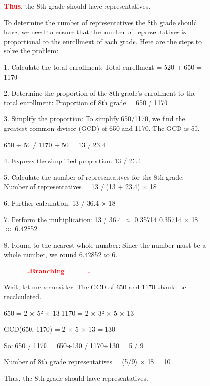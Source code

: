 \documentclass{article}
\begin{document}
\begin{figure}[h]
\begin{minipage}[t]{0.48\linewidth}
\begin{tcolorbox}
\textcolor{red}{\textbf{Thus}}, the 8th grade should have  representatives.
\end{tcolorbox}
\end{minipage} 
\hspace*{\fill}
\begin{minipage}[t]{0.48\linewidth} 
    \begin{tcolorbox}[
        colback=gray!5!white, 
        colframe=blue!75!brown, 
        title=APPO Branching, 
        boxrule=0.3mm, 
        width=\linewidth,  
        arc=2mm, 
        height=18cm,
        auto outer arc=true,
        top=2mm, bottom=2mm, left=2mm, right=2mm 
    ]
To determine the number of representatives the 8th grade should have, we need 
to ensure that the number of representatives is proportional to the enrollment 
of each grade. Here are the steps to solve the problem:

1. Calculate the total enrollment:
   Total enrollment = 520 + 650 = 1170

2. Determine the proportion of the 8th grade's enrollment to the total enrollment:
   Proportion of 8th grade = 650 / 1170

3. Simplify the proportion:
   To simplify 650/1170, we find the greatest common divisor (GCD) of 650 and 
   1170. The GCD is 50.
   
   650 ÷ 50 / 1170 ÷ 50 = 13 / 23.4   

4. Express the simplified proportion:
   13 / 23.4

5. Calculate the number of representatives for the 8th grade:
   Number of representatives = 13 / (13 + 23.4) × 18

6. Further calculation:
   13 / 36.4 × 18

7. Perform the multiplication:
   13 / 36.4 $\approx$ 0.35714
   0.35714 × 18 $\approx$ 6.42852

8. Round to the nearest whole number:
   Since the number must be a whole number, we round 6.42852 to 6.

\textcolor{red}{\textbf{----------Branching----------}}

Wait, let me reconsider. The GCD of 650 and 1170 should be recalculated.

650 = 2 × 5² × 13
1170 = 2 × 3² × 5 × 13

GCD(650, 1170) = 2 × 5 × 13 = 130

So: 650 / 1170 = 650÷130 / 1170÷130 = 5 / 9

Number of 8th grade representatives = (5/9) × 18 = 10

Thus, the 8th grade should have  representatives.
\end{tcolorbox}
\end{minipage}

\end{figure}
\end{document}
